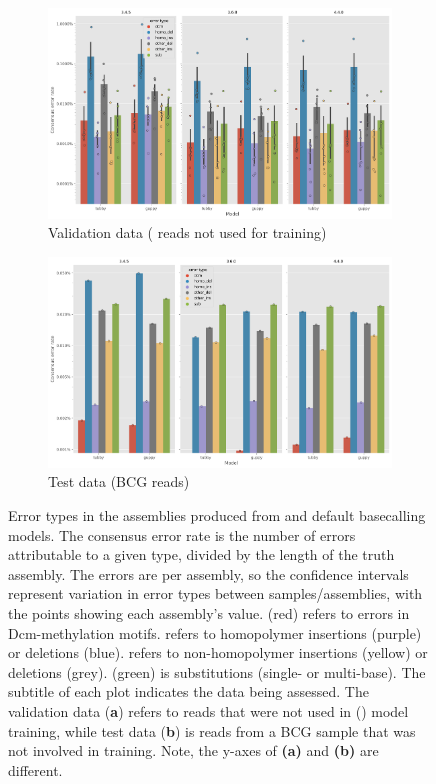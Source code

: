 \begin{figure}
     \centering
     \begin{subfigure}[b]{0.9\textwidth}
        \includegraphics[width=1.0\textwidth]{Chapter4/Figs/eval_error_types.png}
        \centering
        \caption{Validation data (\mtb{} reads not used for training)}
        \label{fig:eval-error_types}
     \end{subfigure}
     \hfill
     \begin{subfigure}[b]{0.9\textwidth}
         \centering
        \includegraphics[width=1.0\textwidth]{Chapter4/Figs/test_error_types.png}
         \caption{Test data (BCG reads)}
         \label{fig:test-error_types}
     \end{subfigure}
        \caption{Error types in the  assemblies produced from \tubby{} and default \guppy{} basecalling models. The consensus error rate is the number of errors attributable to a given type, divided by the length of the truth assembly. The errors are per assembly, so the confidence intervals represent variation in error types between samples/assemblies, with the points showing each assembly's value.  (red) refers to errors in Dcm-methylation motifs.  refers to homopolymer insertions (purple) or deletions (blue).  refers to non-homopolymer insertions (yellow) or deletions (grey).  (green) is substitutions (single- or multi-base). The subtitle of each plot indicates the data being assessed. The validation data (\textbf{a}) refers to \mtb{} reads that were not used in (\tubby{}) model training, while test data (\textbf{b}) is reads from a BCG sample that was not involved in training. Note, the y-axes of \textbf{(a)} and \textbf{(b)} are different.}

\end{figure}
